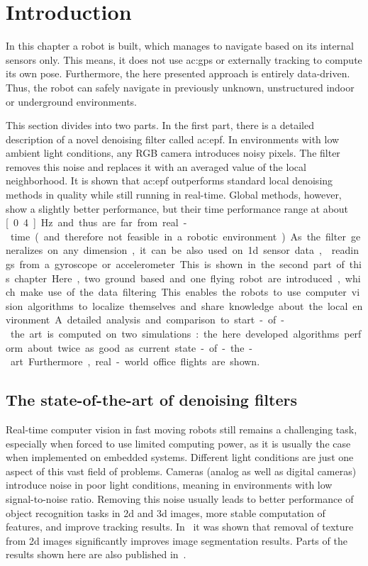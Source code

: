 \section{Introduction}
\label{perception_introduction}

In this chapter a robot is built, which manages to navigate based on its internal sensors only.
This means, it does not use \gls{ac:gps} or externally tracking to compute its own pose.
Furthermore, the here presented approach is entirely data-driven.
Thus, the robot can safely navigate in previously unknown, unstructured indoor or underground environments.


This section divides into two parts.
In the first part, there is a detailed description of a novel denoising filter called \gls{ac:epf}.
In environments with low ambient light conditions, any RGB camera introduces noisy pixels.
The filter removes this noise and replaces it with an averaged value of the local neighborhood.
It is shown that \gls{ac:epf} outperforms standard local denoising methods in quality while still running in real-time.
Global methods, however, show a slightly better performance, but their time performance range at about \unit[0.4]{Hz} and thus are far from real-time (and therefore not feasible in a robotic environment).
As the filter generalizes on any dimension, it can be also used on 1d sensor data, \eg readings from a gyroscope or accelerometer.


This is shown in the second part of this chapter.
Here, two ground based and one flying robot are introduced, which make use of the data filtering.
This enables the robots to use computer vision algorithms to localize themselves and share knowledge about the local environment.
A detailed analysis and comparison to start-of-the art is computed on two simulations: the here developed algorithms perform about twice as good as current state-of-the-art.
Furthermore, real-world office flights are shown.





\subsection{The state-of-the-art of denoising filters}

Real-time computer vision in fast moving robots still remains a challenging task, especially when forced to use limited computing power, as it is usually the case when implemented on embedded systems. 
Different light conditions are just one aspect of this vast field of problems.
Cameras (analog as well as digital cameras) introduce noise in poor light conditions, meaning in environments with low signal-to-noise ratio.
Removing this noise usually leads to better performance of object recognition tasks in 2d and 3d images, more stable computation of features, and improve tracking results.
In~\textcite{reichabramovpapon2013} it was shown  that removal of texture from 2d images significantly improves image segmentation results.
Parts of the results shown here are also published in~\textcite{reichwoergoetterdellen2018}.

